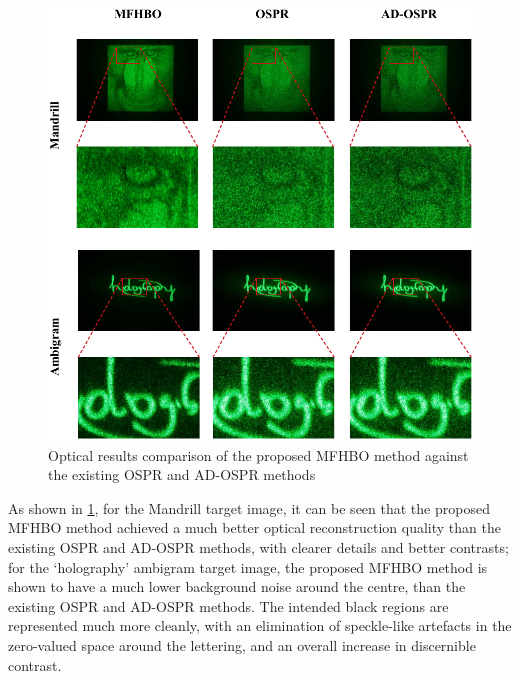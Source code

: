 	\begin{figure}[h!t]
		\centering
		\includegraphics[width=1.0\textwidth]{recon_quality_vs_OSPR_ADOSPR.pdf}
		\caption{Optical results comparison of the proposed MFHBO method against the existing OSPR and AD-OSPR methods}
		\label{fig:recon_quality_vs_OSPR_ADOSPR}
	\end{figure}

	As shown in \cref{fig:recon_quality_vs_OSPR_ADOSPR}, for the Mandrill target image, it can be seen that the proposed MFHBO method achieved a much better optical reconstruction quality than the existing OSPR and AD-OSPR methods, with clearer details and better contrasts; for the `holography' ambigram target image, the proposed MFHBO method is shown to have a much lower background noise around the centre, than the existing OSPR and AD-OSPR methods. The intended black regions are represented much more cleanly, with an elimination of speckle-like artefacts in the zero-valued space around the lettering, and an overall increase in discernible contrast.

